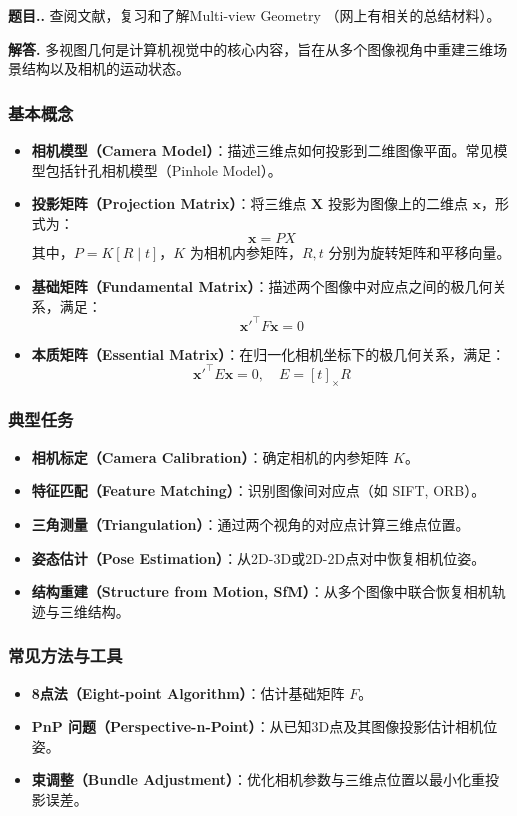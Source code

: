\documentclass[12pt, a4paper, oneside]{ctexart}
\numberwithin{equation}{section}  %
\newcounter{problem}[subsection]  %
\newenvironment{problem}[1][]{\stepcounter{problem}\par\noindent\textbf{题目\thesubsection.\arabic{problem}. #1}}{\smallskip\par}
\newenvironment{solution}[1][]{\par\noindent\textbf{#1解答. }}{\smallskip\par}  %
\begin{document}
\begin{problem}
查阅文献，复习和了解Multi-view Geometry （网上有相关的总结材料）。
\end{problem}
\begin{solution}
多视图几何是计算机视觉中的核心内容，旨在从多个图像视角中重建三维场景结构以及相机的运动状态。
\subsubsection*{基本概念}
\begin{itemize}
  \item \textbf{相机模型（Camera Model）}：描述三维点如何投影到二维图像平面。常见模型包括针孔相机模型（Pinhole Model）。
  
  \item \textbf{投影矩阵（Projection Matrix）}：将三维点 $\boldsymbol{X}$ 投影为图像上的二维点 $\boldsymbol{x}$，形式为：
  \[
  \boldsymbol{x} = P X
  \]
  其中，$P = K [R \mid t]$，$K$ 为相机内参矩阵，$R, t$ 分别为旋转矩阵和平移向量。
  
  \item \textbf{基础矩阵（Fundamental Matrix）}：描述两个图像中对应点之间的极几何关系，满足：
  \[
  \boldsymbol{x}'^\top F \boldsymbol{x} = 0
  \]
  
  \item \textbf{本质矩阵（Essential Matrix）}：在归一化相机坐标下的极几何关系，满足：
  \[
  \boldsymbol{x}'^\top E \boldsymbol{x} = 0,\quad E = [t]_\times R
  \]
\end{itemize}

\subsubsection*{典型任务}
\begin{itemize}
  \item \textbf{相机标定（Camera Calibration）}：确定相机的内参矩阵 $K$。
  \item \textbf{特征匹配（Feature Matching）}：识别图像间对应点（如 SIFT, ORB）。
  \item \textbf{三角测量（Triangulation）}：通过两个视角的对应点计算三维点位置。
  \item \textbf{姿态估计（Pose Estimation）}：从2D-3D或2D-2D点对中恢复相机位姿。
  \item \textbf{结构重建（Structure from Motion, SfM）}：从多个图像中联合恢复相机轨迹与三维结构。
\end{itemize}

\subsubsection*{常见方法与工具}
\begin{itemize}
  \item \textbf{8点法（Eight-point Algorithm）}：估计基础矩阵 $F$。
  \item \textbf{PnP 问题（Perspective-n-Point）}：从已知3D点及其图像投影估计相机位姿。
  \item \textbf{束调整（Bundle Adjustment）}：优化相机参数与三维点位置以最小化重投影误差。
\end{itemize}


\end{solution}
\end{document}
